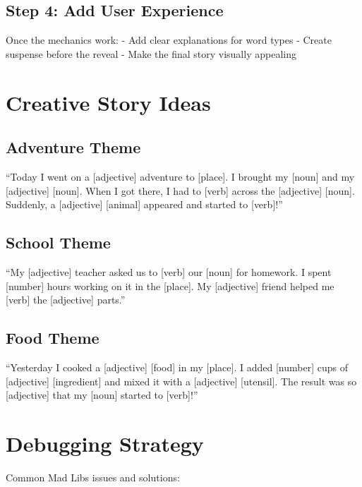 \documentclass[
  letterpaper,
  DIV=11,
  numbers=noendperiod,
  oneside]{scrreprt}
\begin{document}
\subsection{Step 4: Add User
Experience}\label{step-4-add-user-experience}

Once the mechanics work: - Add clear explanations for word types -
Create suspense before the reveal - Make the final story visually
appealing

\section{Creative Story Ideas}\label{creative-story-ideas}

\subsection{Adventure Theme}\label{adventure-theme}

``Today I went on a {[}adjective{]} adventure to {[}place{]}. I brought
my {[}noun{]} and my {[}adjective{]} {[}noun{]}. When I got there, I had
to {[}verb{]} across the {[}adjective{]} {[}noun{]}. Suddenly, a
{[}adjective{]} {[}animal{]} appeared and started to {[}verb{]}!''

\subsection{School Theme}\label{school-theme}

``My {[}adjective{]} teacher asked us to {[}verb{]} our {[}noun{]} for
homework. I spent {[}number{]} hours working on it in the {[}place{]}.
My {[}adjective{]} friend helped me {[}verb{]} the {[}adjective{]}
parts.''

\subsection{Food Theme}\label{food-theme}

``Yesterday I cooked a {[}adjective{]} {[}food{]} in my {[}place{]}. I
added {[}number{]} cups of {[}adjective{]} {[}ingredient{]} and mixed it
with a {[}adjective{]} {[}utensil{]}. The result was so {[}adjective{]}
that my {[}noun{]} started to {[}verb{]}!''

\section{Debugging Strategy}\label{debugging-strategy-1}

Common Mad Libs issues and solutions:
\end{document}
